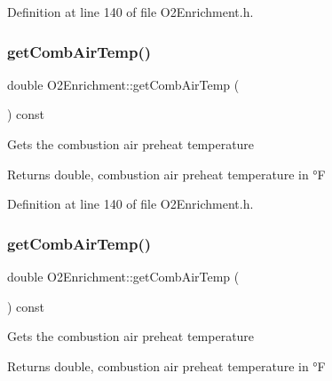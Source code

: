 Definition at line 140 of file O2\+Enrichment.\+h.

\mbox{\label{class_o2_enrichment_ad3e6bab8c49a1ae5232330fc0e1a537a}} 
\subsubsection{\texorpdfstring{get\+Comb\+Air\+Temp()}{getCombAirTemp()}\hspace{0.1cm}{\footnotesize\ttfamily [2/3]}}
{\footnotesize\ttfamily double O2\+Enrichment\+::get\+Comb\+Air\+Temp (\begin{DoxyParamCaption}{ }\end{DoxyParamCaption}) const\hspace{0.3cm}{\ttfamily [inline]}}

Gets the combustion air preheat temperature \begin{DoxyReturn}{Returns}
double, combustion air preheat temperature in °F 
\end{DoxyReturn}


Definition at line 140 of file O2\+Enrichment.\+h.

\mbox{\label{class_o2_enrichment_ad3e6bab8c49a1ae5232330fc0e1a537a}} 
\subsubsection{\texorpdfstring{get\+Comb\+Air\+Temp()}{getCombAirTemp()}\hspace{0.1cm}{\footnotesize\ttfamily [3/3]}}
{\footnotesize\ttfamily double O2\+Enrichment\+::get\+Comb\+Air\+Temp (\begin{DoxyParamCaption}{ }\end{DoxyParamCaption}) const\hspace{0.3cm}{\ttfamily [inline]}}

Gets the combustion air preheat temperature \begin{DoxyReturn}{Returns}
double, combustion air preheat temperature in °F 
\end{DoxyReturn}


